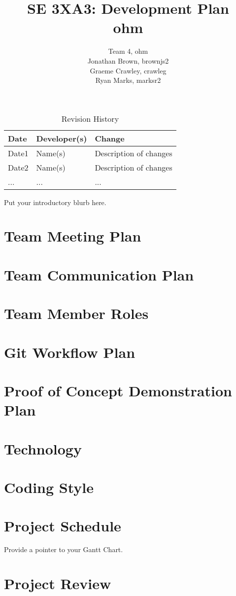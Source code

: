 \documentclass{article}
\title{SE 3XA3: Development Plan \\ohm}
\author{Team 4, ohm
		\\Jonathan Brown, brownjs2
		\\Graeme Crawley, crawleg
		\\Ryan Marks, marksr2
}
\date{}
\begin{document}
\begin{table}[hp]
\caption{Revision History} \label{TblRevisionHistory}
\begin{tabularx}{\textwidth}{llX}
\toprule
\textbf{Date} & \textbf{Developer(s)} & \textbf{Change}\\
\midrule
Date1 & Name(s) & Description of changes\\
Date2 & Name(s) & Description of changes\\
... & ... & ...\\
\bottomrule
\end{tabularx}
\end{table}

\newpage

\maketitle

Put your introductory blurb here.

\section{Team Meeting Plan}

\section{Team Communication Plan}

\section{Team Member Roles}

\section{Git Workflow Plan}

\section{Proof of Concept Demonstration Plan}

\section{Technology}

\section{Coding Style}

\section{Project Schedule}

Provide a pointer to your Gantt Chart.

\section{Project Review}
\end{document}
